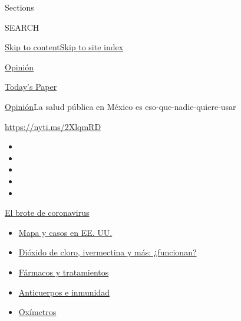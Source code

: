 Sections

SEARCH

\protect\hyperlink{site-content}{Skip to
content}\protect\hyperlink{site-index}{Skip to site index}

\href{https://www.nytimes3xbfgragh.onion/es/section/opinion}{Opinión}

\href{https://myaccount.nytimes3xbfgragh.onion/auth/login?response_type=cookie\&client_id=vi}{}

\href{https://www.nytimes3xbfgragh.onion/section/todayspaper}{Today's
Paper}

\href{/es/section/opinion}{Opinión}\textbar{}La salud pública en México
es eso-que-nadie-quiere-usar

\url{https://nyti.ms/2XlqmRD}

\begin{itemize}
\item
\item
\item
\item
\item
\end{itemize}

\href{https://www.nytimes3xbfgragh.onion/es/spotlight/coronavirus?action=click\&pgtype=Article\&state=default\&region=TOP_BANNER\&context=storylines_menu}{El
brote de coronavirus}

\begin{itemize}
\tightlist
\item
  \href{https://www.nytimes3xbfgragh.onion/es/interactive/2020/espanol/mundo/coronavirus-en-estados-unidos.html?action=click\&pgtype=Article\&state=default\&region=TOP_BANNER\&context=storylines_menu}{Mapa
  y casos en EE. UU.}
\item
  \href{https://www.nytimes3xbfgragh.onion/es/2020/07/23/espanol/america-latina/bolivia-cloro-coronavirus-ivermectina.html?action=click\&pgtype=Article\&state=default\&region=TOP_BANNER\&context=storylines_menu}{Dióxido
  de cloro, ivermectina y más: ¿funcionan?}
\item
  \href{https://www.nytimes3xbfgragh.onion/es/interactive/2020/science/coronavirus-tratamientos-curas.html?action=click\&pgtype=Article\&state=default\&region=TOP_BANNER\&context=storylines_menu}{Fármacos
  y tratamientos}
\item
  \href{https://www.nytimes3xbfgragh.onion/es/2020/07/28/espanol/ciencia-y-tecnologia/anticuerpos-coronavirus-inmunidad.html?action=click\&pgtype=Article\&state=default\&region=TOP_BANNER\&context=storylines_menu}{Anticuerpos
  e inmunidad}
\item
  \href{https://www.nytimes3xbfgragh.onion/es/2020/04/29/espanol/estilos-de-vida/oximetro-para-que-sirve.html?action=click\&pgtype=Article\&state=default\&region=TOP_BANNER\&context=storylines_menu}{Oxímetros}
\end{itemize}

